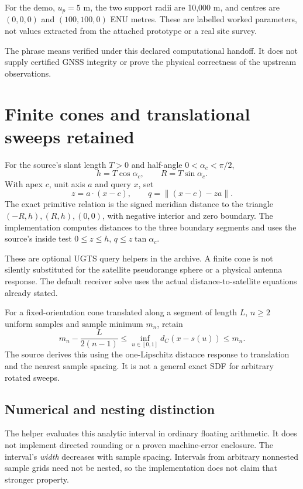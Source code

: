 For the demo, $u_p=5$ m, the two support radii are 10,000 m, and centres are
$(0,0,0)$ and $(100,100,0)$ ENU metres. These are labelled worked parameters, not values
extracted from the attached prototype or a real site survey.

The phrase  means verified under this declared
computational handoff. It does not supply certified GNSS integrity or prove the
physical correctness of the upstream observations.
\clearpage

\section{Finite cones and translational sweeps retained}
For the source's slant length $T>0$ and half-angle $0<\alpha_c<\pi/2$,
\begin{equation}
h=T\cos\alpha_c,\qquad R=T\sin\alpha_c.
\end{equation}
With apex $c$, unit axis $a$ and query $x$, set
\begin{equation}
z=a\cdot(x-c),\qquad q=\|(x-c)-za\|.
\end{equation}
The exact primitive relation is the signed meridian distance to the triangle
$(-R,h),(R,h),(0,0)$, with negative interior and zero boundary. The implementation
computes distances to the three boundary segments and uses the source's inside test
$0\le z\le h$, $q\le z\tan\alpha_c$. 

These are optional UGTS query helpers in the archive. A finite cone is not silently
substituted for the satellite pseudorange sphere or a physical antenna response.
The default receiver solve uses the actual distance-to-satellite equations already stated.

For a fixed-orientation cone translated along a segment of length $L$, $n\ge2$ uniform
samples and sample minimum $m_n$, retain
\begin{equation}
m_n-\frac{L}{2(n-1)}\le\inf_{u\in[0,1]}d_C(x-s(u))\le m_n.
\end{equation}
The source derives this using the one-Lipschitz distance response to translation and
the nearest sample spacing. It is not a general exact SDF for arbitrary rotated sweeps.

\subsection{Numerical and nesting distinction}
The helper evaluates this analytic interval in ordinary floating arithmetic. It does
not implement directed rounding or a proven machine-error enclosure. The interval's
\emph{width} decreases with sample spacing. Intervals from arbitrary nonnested sample
grids need not be nested, so the implementation does not claim that stronger property.

